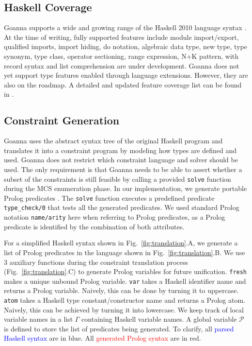     \subsection{Haskell Coverage}
    Goanna supports a wide and growing range of the Haskell 2010 language syntax \cite{Simon_Marlow2010-lg}. At the time of writing, fully supported features include module import/export, qualified imports, import hiding, do notation, algebraic data type, new type, type synonym, type class, operator sectioning, range expression, N+K pattern, with record syntax and list comprehension are under development. Goanna does not yet support type features enabled through language extensions. However, they are also on the roadmap. A detailed and updated feature coverage list can be found in \cite{Anonymous2023-rp}.

    \subsection{Constraint Generation} \label{sub:translation}
    Goanna uses the abstract syntax tree of the original Haskell program and translates it into a constraint program by modeling how types are defined and used. Goanna does not restrict which constraint language and solver should be used. The only requirement is that Goanna needs to be able to assert whether a subset of the constraints is still feasible by calling a provided \texttt{solve} function during the MCS enumeration phase. In our implementation, we generate portable Prolog predicates \cite{Wielemaker2011-sr}. The \texttt{solve} function executes a predefined predicate \texttt{type\_check/0} that tests all the generated predicates. We used standard Prolog notation \texttt{name/arity} here when referring to Prolog predicates, as a Prolog predicate is identified by the combination of both attributes. 

    
    For a simplified Haskell syntax shown in Fig.~\ref{fig:translation}.A, we generate a list of Prolog predicates in the language shown in Fig.~\ref{fig:translation}.B. We use 3 auxiliary functions during the constraint translation process (Fig.~\ref{fig:translation}.C) to generate Prolog variables for future unification. \texttt{fresh} makes a unique unbound Prolog variable. \texttt{var} takes a Haskell identifier name and returns a Prolog variable. Naively, this can be done by turning it to uppercase. \texttt{atom} takes a Haskell type constant/constructor name and returns a Prolog atom. Naively, this can be achieved by turning it into lowercase. We keep track of local variable names in a list $\Gamma$ containing Haskell variable names. A global variable $\mathcal{P}$ is defined to store the list of predicates being generated. To clarify, all \textcolor{blue}{parsed Haskell syntax} are in blue. All \textcolor{red}{generated Prolog syntax} are in red. 
    
